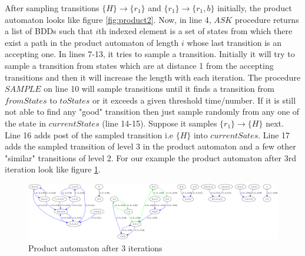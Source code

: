 \documentclass{article}
\begin{document}
After sampling transitions $\{H\} \rightarrow \{r_1\}$ and $\{r_1\}\rightarrow \{r_1,b\}$ initially, the product automaton looks like figure \ref{fig:product2}. Now, in line 4, $ASK$ procedure returns a list of BDDs such that $i$th indexed element is a set of states from which there exist a path in the product automaton of length $i$ whose last transition is an accepting one. In lines 7-13, it tries to sample a transition. Initially it will try to sample a transition from states which are at distance 1 from the accepting transitions and then it will increase the length with each iteration. The procedure $SAMPLE$ on line 10 will sample transitions until it finds a transition from $fromStates$ to $toStates$ or it exceeds a given threshold time/number.
If it is still not able to find any "good" transition then just sample randomly from any one of the state in $currentStates$ (line 14-15). Suppose it samples $\{r_1\}\rightarrow \{H\}$ next. Line 16 adds post of the sampled transition i.e $\{H\}$ into $currentSates$. Line 17 adds the sampled transition of level 3 in the product automaton and a few other "similar" transitions of level 2. For our example the product automaton after 3rd iteration look like figure \ref{fig:product3}.

\begin{figure}
	\centering
	\includegraphics[width=\linewidth]{Fig/product3} \caption{Product automaton after 3 iterations}
	\label{fig:product3}
\end{figure}
\end{document}
